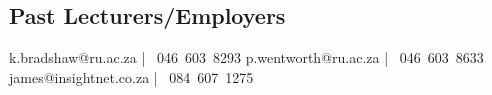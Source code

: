 \documentclass[11pt,a4paper,sans]{moderncv} %
\begin{document}
\subsection{Past Lecturers/Employers}
 			{k.bradshaw@ru.ac.za | ~046~603~8293}
 			{p.wentworth@ru.ac.za | ~046~603~8633}
 					{james@insightnet.co.za | ~084~607~1275}







\end{document}
